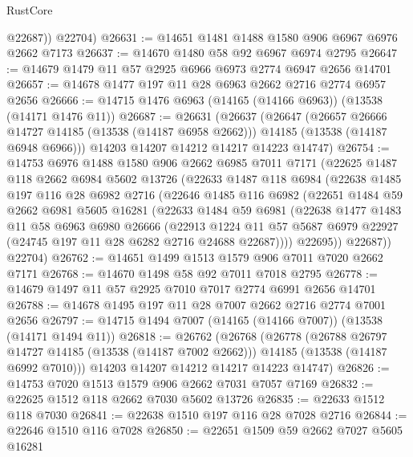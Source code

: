\begin{lexlean}{RustCore}
\begin{coremodule}
          @22687))
      @22704)
@26631 := @14651 @1481 @1488 @1580 @906 @6967 @6976 @2662 @7173
@26637 := @14670 @1480 @58 @92 @6967 @6974 @2795
@26647 := @14679 @1479 @11 @57 @2925 @6966 @6973 @2774 @6947 @2656 @14701
@26657 := @14678 @1477 @197 @11 @28 @6963 @2662 @2716 @2774 @6957 @2656
@26666 := @14715 @1476 @6963 (@14165 (@14166 @6963)) (@13538 (@14171 @1476 @11))
@26687 := @26631
    (@26637
      (@26647
        (@26657 @26666 @14727 @14185 (@13538 (@14187 @6958 @2662)))
        @14185
        (@13538 (@14187 @6948 @6966)))
      @14203
      @14207
      @14212
      @14217
      @14223
      @14747)
@26754 := @14753
    @6976
    @1488
    @1580
    @906
    @2662
    @6985
    @7011
    @7171
    (@22625
      @1487
      @118
      @2662
      @6984
      @5602
      @13726
      (@22633
        @1487
        @118
        @6984
        (@22638
          @1485
          @197
          @116
          @28
          @6982
          @2716
          (@22646
            @1485
            @116
            @6982
            (@22651
              @1484
              @59
              @2662
              @6981
              @5605
              @16281
              (@22633
                @1484
                @59
                @6981
                (@22638
                  @1477
                  @1483
                  @11
                  @58
                  @6963
                  @6980
                  @26666
                  (@22913
                    @1224
                    @11
                    @57
                    @5687
                    @6979
                    @22927
                    (@24745 @197 @11 @28 @6282 @2716 @24688 @22687))))
              @22695))
          @22687))
      @22704)
@26762 := @14651 @1499 @1513 @1579 @906 @7011 @7020 @2662 @7171
@26768 := @14670 @1498 @58 @92 @7011 @7018 @2795
@26778 := @14679 @1497 @11 @57 @2925 @7010 @7017 @2774 @6991 @2656 @14701
@26788 := @14678 @1495 @197 @11 @28 @7007 @2662 @2716 @2774 @7001 @2656
@26797 := @14715 @1494 @7007 (@14165 (@14166 @7007)) (@13538 (@14171 @1494 @11))
@26818 := @26762
    (@26768
      (@26778
        (@26788 @26797 @14727 @14185 (@13538 (@14187 @7002 @2662)))
        @14185
        (@13538 (@14187 @6992 @7010)))
      @14203
      @14207
      @14212
      @14217
      @14223
      @14747)
@26826 := @14753 @7020 @1513 @1579 @906 @2662 @7031 @7057 @7169
@26832 := @22625 @1512 @118 @2662 @7030 @5602 @13726
@26835 := @22633 @1512 @118 @7030
@26841 := @22638 @1510 @197 @116 @28 @7028 @2716
@26844 := @22646 @1510 @116 @7028
@26850 := @22651 @1509 @59 @2662 @7027 @5605 @16281

\end{coremodule}
\end{lexlean}
